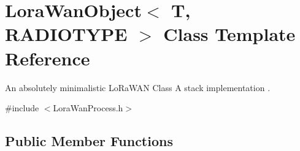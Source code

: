 \hypertarget{class_lora_wan_object}{}\section{Lora\+Wan\+Object$<$ T, R\+A\+D\+I\+O\+T\+Y\+PE $>$ Class Template Reference}
\label{class_lora_wan_object}


An absolutely minimalistic Lo\+Ra\+W\+AN Class A stack implementation .  




{\ttfamily \#include $<$Lora\+Wan\+Process.\+h$>$}

\subsection*{Public Member Functions}

